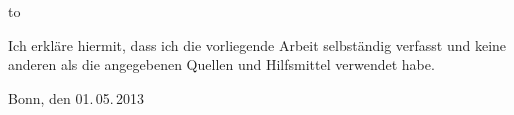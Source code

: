 \thispagestyle{empty}

\vspace*{35\baselineskip}

\begin{minipage}{\fullwidth}
\hbox to \textwidth{\hrulefill}
\par
Ich erkläre hiermit, dass ich die vorliegende Arbeit selbständig verfasst und keine anderen als die angegebenen Quellen und Hilfsmittel verwendet habe.

\vspace{1cm}
Bonn, den 01.\,05.\,2013

\end{minipage}
